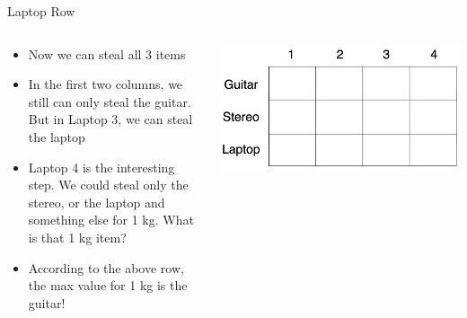 \documentclass[
  ignorenonframetext,
]{beamer}
\begin{document}
\begin{frame}{Laptop Row}
\protect\hypertarget{laptop-row}{}
\begin{columns}[T]
\begin{column}{0.5\textwidth}
\begin{itemize}
\item
  Now we can steal all 3 items
\item
  In the first two columns, we still can only steal the guitar. But in
  Laptop 3, we can steal the laptop
\item
  Laptop 4 is the interesting step. We could steal only the stereo, or
  the laptop and something else for 1 kg. What is that 1 kg item?
\item
  According to the above row, the max value for 1 kg is the guitar!
\end{itemize}
\end{column}

\begin{column}{0.5\textwidth}
\includegraphics{images/dynamic.png}
\end{column}
\end{columns}
\end{frame}
\end{document}
